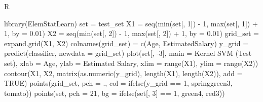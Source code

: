 \documentclass[
]{book}
\newenvironment{Shaded}{\begin{snugshade}}{\end{snugshade}}
\newcommand{\AttributeTok}[1]{\textcolor[rgb]{0.77,0.63,0.00}{#1}}
\newcommand{\ConstantTok}[1]{\textcolor[rgb]{0.00,0.00,0.00}{#1}}
\newcommand{\DecValTok}[1]{\textcolor[rgb]{0.00,0.00,0.81}{#1}}
\newcommand{\FloatTok}[1]{\textcolor[rgb]{0.00,0.00,0.81}{#1}}
\newcommand{\FunctionTok}[1]{\textcolor[rgb]{0.00,0.00,0.00}{#1}}
\newcommand{\NormalTok}[1]{#1}
\newcommand{\OtherTok}[1]{\textcolor[rgb]{0.56,0.35,0.01}{#1}}
\newcommand{\SpecialCharTok}[1]{\textcolor[rgb]{0.00,0.00,0.00}{#1}}
\newcommand{\StringTok}[1]{\textcolor[rgb]{0.31,0.60,0.02}{#1}}
\theoremstyle{definition}
\theoremstyle{definition}
\theoremstyle{definition}
\theoremstyle{definition}
\theoremstyle{remark}
\begin{document}
R

\begin{Shaded}
\begin{Highlighting}[]
\FunctionTok{library}\NormalTok{(ElemStatLearn)}
\NormalTok{set }\OtherTok{=}\NormalTok{ test\_set}
\NormalTok{X1 }\OtherTok{=} \FunctionTok{seq}\NormalTok{(}\FunctionTok{min}\NormalTok{(set[, }\DecValTok{1}\NormalTok{]) }\SpecialCharTok{{-}} \DecValTok{1}\NormalTok{, }\FunctionTok{max}\NormalTok{(set[, }\DecValTok{1}\NormalTok{]) }\SpecialCharTok{+} \DecValTok{1}\NormalTok{, }\AttributeTok{by =} \FloatTok{0.01}\NormalTok{)}
\NormalTok{X2 }\OtherTok{=} \FunctionTok{seq}\NormalTok{(}\FunctionTok{min}\NormalTok{(set[, }\DecValTok{2}\NormalTok{]) }\SpecialCharTok{{-}} \DecValTok{1}\NormalTok{, }\FunctionTok{max}\NormalTok{(set[, }\DecValTok{2}\NormalTok{]) }\SpecialCharTok{+} \DecValTok{1}\NormalTok{, }\AttributeTok{by =} \FloatTok{0.01}\NormalTok{)}
\NormalTok{grid\_set }\OtherTok{=} \FunctionTok{expand.grid}\NormalTok{(X1, X2)}
\FunctionTok{colnames}\NormalTok{(grid\_set) }\OtherTok{=} \FunctionTok{c}\NormalTok{(}\StringTok{\textquotesingle{}Age\textquotesingle{}}\NormalTok{, }\StringTok{\textquotesingle{}EstimatedSalary\textquotesingle{}}\NormalTok{)}
\NormalTok{y\_grid }\OtherTok{=} \FunctionTok{predict}\NormalTok{(classifier, }\AttributeTok{newdata =}\NormalTok{ grid\_set)}
\FunctionTok{plot}\NormalTok{(set[, }\SpecialCharTok{{-}}\DecValTok{3}\NormalTok{], }\AttributeTok{main =} \StringTok{\textquotesingle{}Kernel SVM (Test set)\textquotesingle{}}\NormalTok{,}
     \AttributeTok{xlab =} \StringTok{\textquotesingle{}Age\textquotesingle{}}\NormalTok{, }\AttributeTok{ylab =} \StringTok{\textquotesingle{}Estimated Salary\textquotesingle{}}\NormalTok{,}
     \AttributeTok{xlim =} \FunctionTok{range}\NormalTok{(X1), }\AttributeTok{ylim =} \FunctionTok{range}\NormalTok{(X2))}
\FunctionTok{contour}\NormalTok{(X1, X2, }\FunctionTok{matrix}\NormalTok{(}\FunctionTok{as.numeric}\NormalTok{(y\_grid), }\FunctionTok{length}\NormalTok{(X1), }\FunctionTok{length}\NormalTok{(X2)), }\AttributeTok{add =} \ConstantTok{TRUE}\NormalTok{)}
\FunctionTok{points}\NormalTok{(grid\_set, }\AttributeTok{pch =} \StringTok{\textquotesingle{}.\textquotesingle{}}\NormalTok{, }\AttributeTok{col =} \FunctionTok{ifelse}\NormalTok{(y\_grid }\SpecialCharTok{==} \DecValTok{1}\NormalTok{, }\StringTok{\textquotesingle{}springgreen3\textquotesingle{}}\NormalTok{, }\StringTok{\textquotesingle{}tomato\textquotesingle{}}\NormalTok{))}
\FunctionTok{points}\NormalTok{(set, }\AttributeTok{pch =} \DecValTok{21}\NormalTok{, }\AttributeTok{bg =} \FunctionTok{ifelse}\NormalTok{(set[, }\DecValTok{3}\NormalTok{] }\SpecialCharTok{==} \DecValTok{1}\NormalTok{, }\StringTok{\textquotesingle{}green4\textquotesingle{}}\NormalTok{, }\StringTok{\textquotesingle{}red3\textquotesingle{}}\NormalTok{))}
\end{Highlighting}
\end{Shaded}
\end{document}
